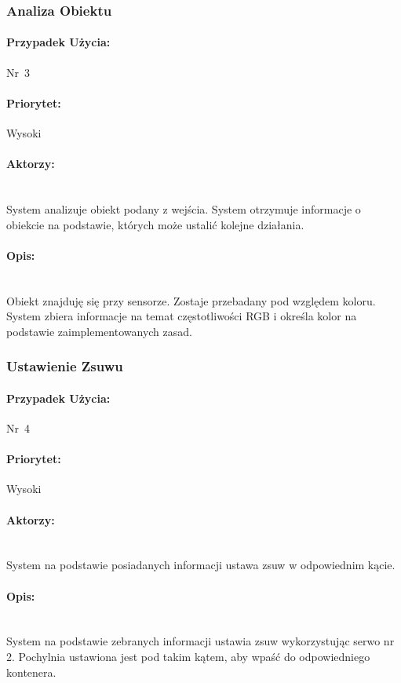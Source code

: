 \documentclass[12pt]{article}
\begin{document}
\subsubsection{Analiza Obiektu}
\paragraph{Przypadek Użycia:}\mbox{Nr 3}
\paragraph{Priorytet:}\mbox{Wysoki}	
\paragraph{Aktorzy:}\mbox{} \\
System analizuje obiekt podany z wejścia. System otrzymuje informacje o obiekcie na podstawie, których może ustalić kolejne działania.
\paragraph{Opis:}\mbox{} \\
Obiekt znajduję się przy sensorze. Zostaje przebadany pod względem koloru. System zbiera informacje na temat częstotliwości RGB i określa kolor na podstawie zaimplementowanych zasad.

\subsubsection{Ustawienie Zsuwu}
\paragraph{Przypadek Użycia:}\mbox{Nr 4}
\paragraph{Priorytet:}\mbox{Wysoki}	
\paragraph{Aktorzy:}\mbox{} \\
System na podstawie posiadanych informacji ustawa zsuw w odpowiednim kącie.
\paragraph{Opis:}\mbox{} \\
System na podstawie zebranych informacji ustawia zsuw wykorzystując serwo nr 2. Pochylnia ustawiona jest pod takim kątem, aby wpaść do odpowiedniego kontenera.
\end{document}
